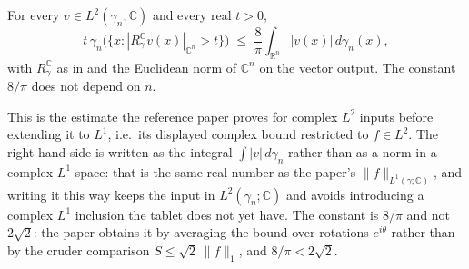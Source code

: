 \begin{lemma}
For every $v \in L^2(\gamma_n;\mathbb{C})$ and every real $t > 0$,
\[
  t\,\gamma_n\bigl(\{x : |R_\gamma^{\mathbb{C}} v(x)|_{\mathbb{C}^n} > t\}\bigr)
    \;\leq\; \frac{8}{\pi}\int_{\mathbb{R}^n} |v(x)| \, d\gamma_n(x) ,
\]
with $R_\gamma^{\mathbb{C}}$ as in  and the
Euclidean norm of $\mathbb{C}^n$ on the vector output.  The constant $8/\pi$ does
not depend on $n$.

This is the estimate the reference paper proves for complex $L^2$ inputs before
extending it to $L^1$, i.e.\ its displayed complex bound restricted to
$f \in L^2$.  The right-hand side is written as the integral
$\int|v|\,d\gamma_n$ rather than as a norm in a complex $L^1$ space: that is the
same real number as the paper's $\|f\|_{L^1(\gamma;\mathbb{C})}$, and writing it
this way keeps the input in $L^2(\gamma_n;\mathbb{C})$ and avoids introducing a
complex $L^1$ inclusion the tablet does not yet have.  The constant is $8/\pi$
and not $2\sqrt2$: the paper obtains it by averaging the bound over rotations
$e^{i\theta}$ rather than by the cruder comparison
$S \leq \sqrt2\,\|f\|_1$, and $8/\pi < 2\sqrt2$.
\end{lemma}
